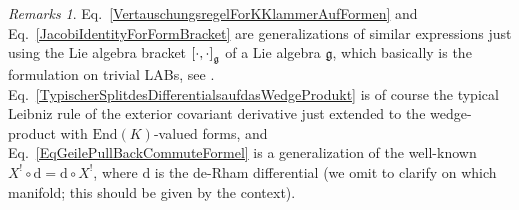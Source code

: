 \documentclass[preprint]{elsarticle}
\theoremstyle{plain}
\theoremstyle{remark}
\newtheorem*{remarkohne}{Remarks}
\theoremstyle{definition}
\begin{document}
\begin{remarkohne}
\leavevmode\newline
Eq.~\eqref{VertauschungsregelForKKlammerAufFormen} and Eq.~\eqref{JacobiIdentityForFormBracket} are generalizations of similar expressions just using the Lie algebra bracket $\mleft[ \cdot, \cdot\mright]_{\mathfrak{g}}$ of a Lie algebra $\mathfrak{g}$, which basically is the formulation on trivial LABs, see \cite[\S 5, first and second statement of Exercise 5.15.14; page 316]{hamilton}. Eq.~\eqref{TypischerSplitdesDifferentialsaufdasWedgeProdukt} is of course the typical Leibniz rule of the exterior covariant derivative just extended to the wedge-product with $\mathrm{End}(K)$-valued forms, and Eq.~\eqref{EqGeilePullBackCommuteFormel} is a generalization of the well-known $X^! \circ \mathrm{d} = \mathrm{d} \circ X^!$, where $\mathrm{d}$ is the de-Rham differential (we omit to clarify on which manifold; this should be given by the context).
\end{remarkohne}
\end{document}
